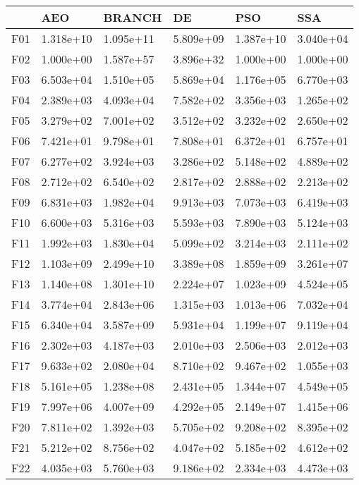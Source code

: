 \begin{tabular}{llllll}
\toprule
{} &        AEO &     BRANCH &         DE &        PSO &        SSA \\
\midrule
F01  &  1.318e+10 &  1.095e+11 &  5.809e+09 &  1.387e+10 &  3.040e+04 \\
F02  &  1.000e+00 &  1.587e+57 &  3.896e+32 &  1.000e+00 &  1.000e+00 \\
F03  &  6.503e+04 &  1.510e+05 &  5.869e+04 &  1.176e+05 &  6.770e+03 \\
F04  &  2.389e+03 &  4.093e+04 &  7.582e+02 &  3.356e+03 &  1.265e+02 \\
F05  &  3.279e+02 &  7.001e+02 &  3.512e+02 &  3.232e+02 &  2.650e+02 \\
F06  &  7.421e+01 &  9.798e+01 &  7.808e+01 &  6.372e+01 &  6.757e+01 \\
F07  &  6.277e+02 &  3.924e+03 &  3.286e+02 &  5.148e+02 &  4.889e+02 \\
F08  &  2.712e+02 &  6.540e+02 &  2.817e+02 &  2.888e+02 &  2.213e+02 \\
F09  &  6.831e+03 &  1.982e+04 &  9.913e+03 &  7.073e+03 &  6.419e+03 \\
F10  &  6.600e+03 &  5.316e+03 &  5.593e+03 &  7.890e+03 &  5.124e+03 \\
F11  &  1.992e+03 &  1.830e+04 &  5.099e+02 &  3.214e+03 &  2.111e+02 \\
F12  &  1.103e+09 &  2.499e+10 &  3.389e+08 &  1.859e+09 &  3.261e+07 \\
F13  &  1.140e+08 &  1.301e+10 &  2.224e+07 &  1.023e+09 &  4.524e+05 \\
F14  &  3.774e+04 &  2.843e+06 &  1.315e+03 &  1.013e+06 &  7.032e+04 \\
F15  &  6.340e+04 &  3.587e+09 &  5.931e+04 &  1.199e+07 &  9.119e+04 \\
F16  &  2.302e+03 &  4.187e+03 &  2.010e+03 &  2.506e+03 &  2.012e+03 \\
F17  &  9.633e+02 &  2.080e+04 &  8.710e+02 &  9.467e+02 &  1.055e+03 \\
F18  &  5.161e+05 &  1.238e+08 &  2.431e+05 &  1.344e+07 &  4.549e+05 \\
F19  &  7.997e+06 &  4.007e+09 &  4.292e+05 &  2.149e+07 &  1.415e+06 \\
F20  &  7.811e+02 &  1.392e+03 &  5.705e+02 &  9.208e+02 &  8.395e+02 \\
F21  &  5.212e+02 &  8.756e+02 &  4.047e+02 &  5.185e+02 &  4.612e+02 \\
F22  &  4.035e+03 &  5.760e+03 &  9.186e+02 &  2.334e+03 &  4.473e+03 \\

\end{tabular}
